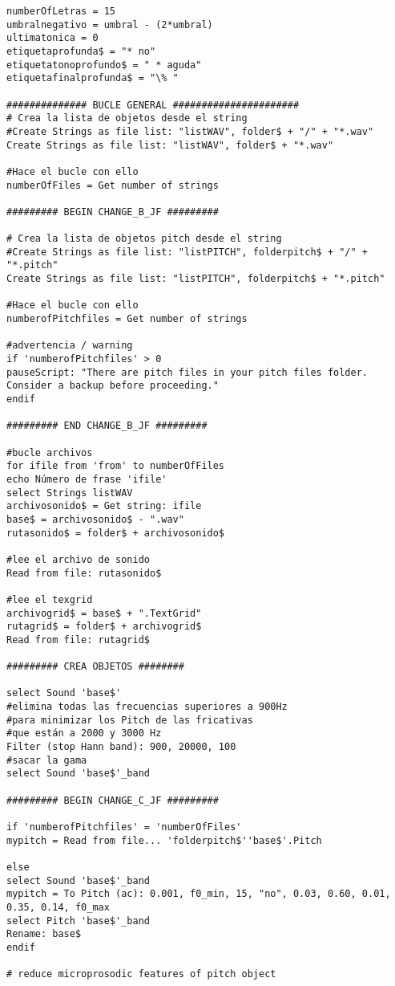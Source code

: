 \begin{lstlisting}
numberOfLetras = 15
umbralnegativo = umbral - (2*umbral)
ultimatonica = 0
etiquetaprofunda$ = "* no"
etiquetatonoprofundo$ = " * aguda"
etiquetafinalprofunda$ = "\% "

############## BUCLE GENERAL ######################
# Crea la lista de objetos desde el string
#Create Strings as file list: "listWAV", folder$ + "/" + "*.wav"
Create Strings as file list: "listWAV", folder$ + "*.wav"

#Hace el bucle con ello
numberOfFiles = Get number of strings

######### BEGIN CHANGE_B_JF #########

# Crea la lista de objetos pitch desde el string
#Create Strings as file list: "listPITCH", folderpitch$ + "/" + "*.pitch"
Create Strings as file list: "listPITCH", folderpitch$ + "*.pitch"

#Hace el bucle con ello
numberofPitchfiles = Get number of strings

#advertencia / warning
if 'numberofPitchfiles' > 0
pauseScript: "There are pitch files in your pitch files folder. 
Consider a backup before proceeding."
endif

######### END CHANGE_B_JF #########

#bucle archivos
for ifile from 'from' to numberOfFiles
echo Número de frase 'ifile'
select Strings listWAV
archivosonido$ = Get string: ifile
base$ = archivosonido$ - ".wav"
rutasonido$ = folder$ + archivosonido$

#lee el archivo de sonido
Read from file: rutasonido$

#lee el texgrid
archivogrid$ = base$ + ".TextGrid"
rutagrid$ = folder$ + archivogrid$
Read from file: rutagrid$

######### CREA OBJETOS ########

select Sound 'base$'
#elimina todas las frecuencias superiores a 900Hz 
#para minimizar los Pitch de las fricativas 
#que están a 2000 y 3000 Hz
Filter (stop Hann band): 900, 20000, 100
#sacar la gama
select Sound 'base$'_band

######### BEGIN CHANGE_C_JF #########

if 'numberofPitchfiles' = 'numberOfFiles' 
mypitch = Read from file... 'folderpitch$''base$'.Pitch

else
select Sound 'base$'_band
mypitch = To Pitch (ac): 0.001, f0_min, 15, "no", 0.03, 0.60, 0.01, 0.35, 0.14, f0_max
select Pitch 'base$'_band
Rename: base$
endif

# reduce microprosodic features of pitch object


\end{lstlisting}
